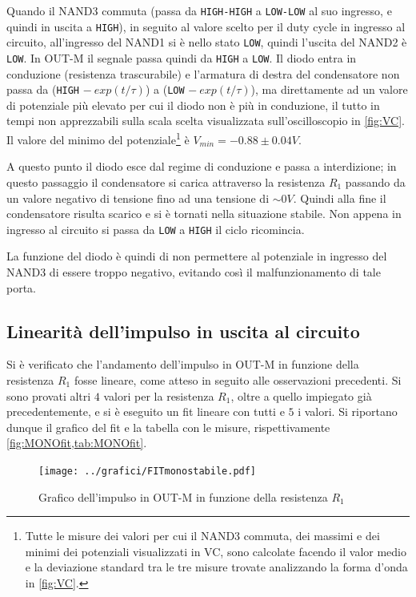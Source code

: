 \documentclass[a4paper,10pt]{article}
\def\code#1{\texttt{#1}}
\begin{document}
Quando il NAND3 commuta (passa da \code{HIGH-HIGH} a \code{LOW-LOW} al suo ingresso, e quindi in uscita a \code{HIGH}), in seguito al valore scelto per il duty cycle in ingresso al circuito, all'ingresso del NAND1 si è nello stato \code{LOW}, quindi l'uscita del NAND2 è \code{LOW}. In OUT-M il segnale passa quindi da \code{HIGH} a \code{LOW}. Il diodo entra in conduzione (resistenza trascurabile) e l'armatura di destra del condensatore non passa da (\code{HIGH} $-~exp(t/\tau)$) a (\code{LOW} $-~exp(t/\tau)$), ma direttamente ad un valore di potenziale più elevato per cui il diodo non è più in conduzione, il tutto in tempi non apprezzabili sulla scala scelta visualizzata sull'oscilloscopio in \cref{fig:VC}. Il valore del minimo del potenziale\footnote{Tutte le misure dei valori per cui il NAND3 commuta, dei massimi e dei minimi dei potenziali visualizzati in VC, sono calcolate facendo il valor medio e la deviazione standard tra le tre misure trovate analizzando la forma d'onda in \cref{fig:VC}.} è $V_{min} = -0.88\pm 0.04 V$.

A questo punto il diodo esce dal regime di conduzione e passa a interdizione; in questo passaggio il condensatore si carica attraverso la resistenza $R_1$ passando da un valore negativo di tensione fino ad una tensione di $\sim 0V$. Quindi alla fine il condensatore risulta scarico e si è tornati nella situazione stabile. Non appena in ingresso al circuito si passa da \code{LOW} a \code{HIGH} il ciclo ricomincia.

La funzione del diodo è quindi di non permettere al potenziale in ingresso del NAND3 di essere troppo negativo, evitando così il malfunzionamento di tale porta.


\subsection{Linearità dell'impulso in uscita al circuito}
Si è verificato che l'andamento dell'impulso in OUT-M in funzione della resistenza $R_1$ fosse lineare, come atteso in seguito alle osservazioni precedenti.
Si sono provati altri $4$ valori per la resistenza $R_1$, oltre a quello impiegato già precedentemente, e si è eseguito un fit lineare con tutti e $5$ i valori. Si riportano dunque il grafico del fit e la tabella con le misure, rispettivamente \cref{fig:MONOfit,tab:MONOfit}.

\begin{figure}[H]
	\centering
	\begin{minipage}{0.49\textwidth}
		\centering
		\texttt{[image: ../grafici/FITmonostabile.pdf]}
		\caption{Grafico dell'impulso in OUT-M in funzione della resistenza $R_1$}
		\label{fig:MONOfit}
	\end{minipage}
	\begin{minipage}{0.49\textwidth}
		\centering
		\resizebox{0.7\textwidth}{!}{
			}
		\label{tab:MONOfit}
	\end{minipage}
\end{figure}
\end{document}
